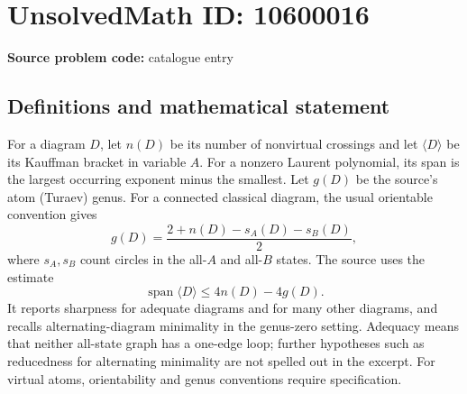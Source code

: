\documentclass[11pt]{article}
\begin{document}
\section*{UnsolvedMath ID: 10600016}
\textbf{Source problem code:} catalogue entry
\subsection{Definitions and mathematical statement}
For a diagram \(D\), let \(n(D)\) be its number of nonvirtual crossings and let \(\langle D\rangle\) be its Kauffman bracket in variable \(A\). For a nonzero Laurent polynomial, its span is the largest occurring exponent minus the smallest. Let \(g(D)\) be the source's atom (Turaev) genus. For a connected classical diagram, the usual orientable convention gives
\[
 g(D)=\frac{2+n(D)-s_A(D)-s_B(D)}2,
\]
where \(s_A,s_B\) count circles in the all-\(A\) and all-\(B\) states. The source uses the estimate
\[
 \operatorname{span}\langle D\rangle\leq4n(D)-4g(D).
\]
It reports sharpness for adequate diagrams and for many other diagrams, and recalls alternating-diagram minimality in the genus-zero setting. Adequacy means that neither all-state graph has a one-edge loop; further hypotheses such as reducedness for alternating minimality are not spelled out in the excerpt. For virtual atoms, orientability and genus conventions require specification.
\end{document}
